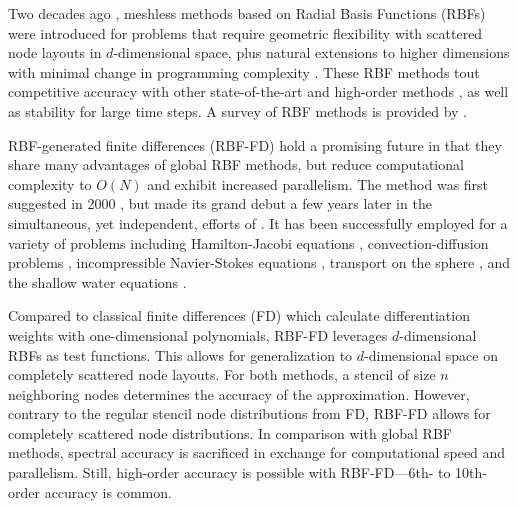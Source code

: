 Two decades ago \cite{Kansa1990a}, meshless methods based on Radial Basis Functions (RBFs) were introduced for problems that require geometric flexibility with scattered node layouts in $d$-dimensional space, plus natural extensions to higher dimensions with minimal change in programming complexity \cite{FlyerWright07,WrightFlyerYuen10}. These RBF methods tout competitive accuracy with other state-of-the-art and high-order methods \cite{FlyerWright07, FlyerWright09, FlyerLehto10, WrightFlyerYuen10, FlyerFornberg11}, as well as stability for large time steps. A survey of RBF methods is provided by \cite{FlyerFornberg11}.




 RBF-generated finite differences (RBF-FD) hold a promising future in that they share many advantages of global RBF methods, but reduce computational complexity to $O(N)$
 and exhibit increased parallelism. The method was first suggested in 2000 \cite{Tolstykh2000}, but made its grand debut a few years later in the simultaneous, yet independent,
efforts of \cite{Shu2003,Tolstykh2003a, Wright2003, Cecil2004}. It has been successfully employed for a variety of problems including Hamilton-Jacobi equations \cite{Cecil2004}, convection-diffusion problems \cite{Chandhini2007, Stevens2009b},
incompressible Navier-Stokes equations \cite{Shu2003,Chinchapatnam2009}, transport on the sphere \cite{FornbergLehto11}, and the shallow water equations \cite{FlyerLehto11}.

Compared to classical finite differences (FD) which calculate differentiation weights with one-dimensional polynomials, RBF-FD leverages $d$-dimensional RBFs as test functions. This allows for generalization to $d$-dimensional space on completely scattered node layouts. For both methods, a stencil of size $n$ neighboring nodes determines the accuracy of the approximation. However, contrary to the regular stencil node distributions from FD, RBF-FD allows for completely scattered node distributions. In comparison with global RBF methods, spectral accuracy is sacrificed in exchange for computational speed and parallelism. Still, high-order accuracy is possible with RBF-FD---6th- to 10th-order accuracy is common.

